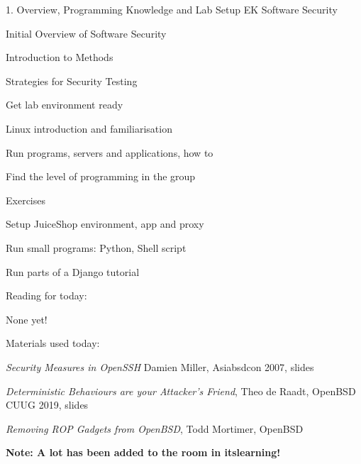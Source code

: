 \documentclass[Screen16to9,17pt]{foils}
\begin{document}
\mytitlepage
{1. Overview, Programming Knowledge and Lab Setup}
{EK Software Security}


\begin{list1}
\item Initial Overview of Software Security
\begin{list2}
\item Introduction to Methods
\item Strategies for Security Testing
\end{list2}
\item Get lab environment ready
\begin{list2}
\item Linux introduction and familiarisation
\item Run programs, servers and applications, how to
\item Find the level of programming in the group
\end{list2}

\item Exercises
\begin{list2}
\item Setup JuiceShop environment, app and proxy
\item Run small programs: Python, Shell script
\item Run parts of a Django tutorial
\end{list2}
\end{list1}


Reading for today:
\begin{list2}
\item None yet!
\end{list2}

Materials used today:
\begin{list2}
\item \emph{Security Measures in OpenSSH} Damien Miller, Asiabsdcon 2007, slides
\item \emph{Deterministic Behaviours are your Attacker's Friend}, Theo de Raadt, OpenBSD  CUUG 2019, slides
\item \emph{Removing ROP Gadgets from OpenBSD}, Todd Mortimer, OpenBSD
\end{list2}


{\bf Note: A lot has been added to the room in itslearning!}


\end{document}
